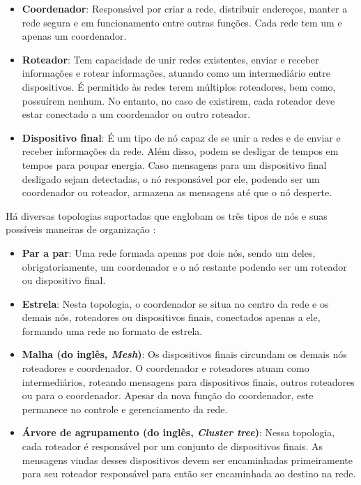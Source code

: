 \begin{itemize} \parskip -4pt
	\item \textbf{Coordenador}: Responsável por criar a rede, distribuir endereços, manter a rede segura e em funcionamento entre outras funções. Cada rede tem um e apenas um coordenador.
	\item \textbf{Roteador}: Tem capacidade de unir redes existentes, enviar e receber informações e rotear 	informações, atuando como um intermediário entre dispositivos. É permitido às redes terem múltiplos roteadores, bem como, possuírem nenhum. No entanto, no caso de existirem, cada roteador deve estar conectado a um coordenador ou outro roteador.
	\item \textbf{Dispositivo final}: É um tipo de nó capaz de se unir a redes e de enviar e receber informações da rede. Além disso, podem se desligar de tempos em tempos para poupar energia. Caso mensagens para um dispositivo final desligado sejam detectadas, o nó responsável por ele, podendo ser um coordenador ou roteador, armazena as mensagens até que o nó desperte.
\end{itemize}

Há diversas topologias suportadas que englobam os três tipos de nós e suas possíveis 
maneiras de organização \cite{Faludi2011}:

\begin{itemize} \parskip -4pt
	\item \textbf{Par a par}: Uma rede formada apenas por dois nós, sendo um deles, obrigatoriamente, um 
	coordenador e o nó restante podendo ser um roteador ou dispositivo final.
	\item \textbf{Estrela}: Nesta topologia, o coordenador se situa no centro da rede e os demais nós, 
	roteadores ou dispositivos finais, conectados apenas a ele, formando uma rede no formato de 
	estrela.
	\item \textbf{Malha (do inglês, \textit{Mesh})}: Os dispositivos finais circundam os demais nós roteadores e coordenador. O coordenador e roteadores atuam como intermediários, roteando mensagens para dispositivos finais, outros roteadores ou para o coordenador. Apesar da nova função do coordenador, este permanece no controle e gerenciamento da rede.
	\item \textbf{Árvore de agrupamento (do inglês, \textit{Cluster tree})}: Nessa topologia, cada roteador é responsável por um conjunto de dispositivos finais. As mensagens vindas desses dispositivos devem ser encaminhadas primeiramente para seu roteador responsável para então ser encaminhada ao destino na rede.
\end{itemize}

